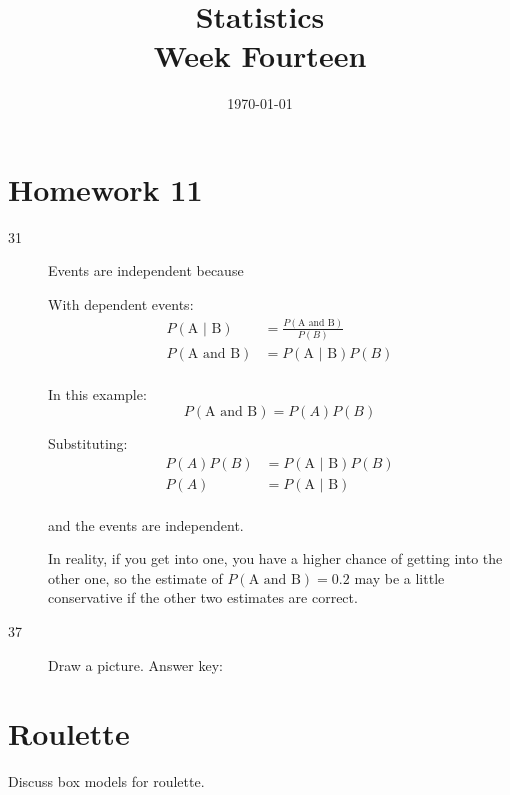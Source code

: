 \documentclass[letterpaper, landscape]{exam}
\title{Statistics \\ Week Fourteen}
\date{\today}
\author{}
\begin{document}
  \maketitle
  \tableofcontents

  \section{Homework 11}
  \begin{description}
    \item[31] Events are independent because

      With dependent events:
      \begin{align*}
        P( \text{A } | \text{ B} ) & = \frac{ P(\text{A and B}) }{ P(B) } \\
        P( \text{A and B} )        & = P( \text{A } | \text{ B} ) P(B) \\
      \end{align*}

      In this example:
      \[
        P(\text{A and B}) = P(A) P(B)
      \]

      Substituting:
      \begin{align*}
        P(A) P(B) & = P( \text{A } | \text{ B} ) P(B) \\
        P(A)      & = P( \text{A } | \text{ B} ) \\
      \end{align*}

      and the events are independent.

      In reality, if you get into one, you have a higher chance of getting into
      the other one, so the estimate of $P(\text{A and B}) = 0.2$ may be a
      little conservative if the other two estimates are correct.


    \item[37] Draw a picture. Answer key:

  \end{description}

  \section{Roulette}
  Discuss box models for roulette.
\end{document}
